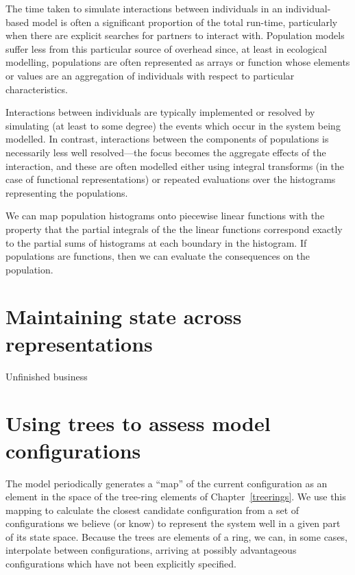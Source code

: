 The time taken to simulate interactions between individuals in an
individual-based model is often a significant proportion of the total
run-time, particularly when there are explicit searches for partners
to interact with.  Population models suffer less from this particular
source of overhead since, at least in ecological modelling,
populations are often represented as arrays or function whose elements
or values are an aggregation of individuals with respect to particular
characteristics.

Interactions between individuals are typically implemented or resolved
by simulating (at least to some degree) the events which occur in the
system being modelled. In contrast, interactions between the
components of populations is necessarily less well resolved---the
focus becomes the aggregate effects of the interaction, and these are
often modelled either using integral transforms (in the case of
functional representations) or repeated evaluations over the
histograms representing the populations.

We can map population histograms onto piecewise linear functions with
the property that the partial integrals of the the linear functions
correspond exactly to the partial sums of histograms at each boundary
in the histogram.  If populations are functions, then we can evaluate
the consequences on the population.












\section{Maintaining state across representations}

Unfinished business

\section{Using trees to assess model configurations}

The model periodically generates a ``map'' of the current
configuration as an element in the space of the tree-ring elements of
Chapter~\ref{treerings}.  We use this mapping to calculate the
closest candidate configuration from a set of configurations we
believe (or know) to represent the system well in a given part of its
state space. Because the trees are elements of a ring, we can, in some cases,
interpolate between configurations, arriving at possibly advantageous
configurations which have not been explicitly specified.

